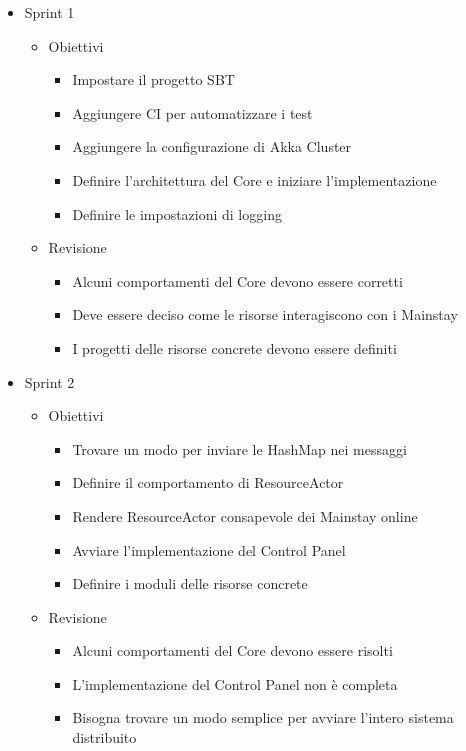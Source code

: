 \documentclass[12pt]{article}
\begin{document}
\begin{itemize}
    \item Sprint 1
    \begin{itemize}
        \item Obiettivi
        \begin{itemize}
            \item Impostare il progetto SBT
            \item Aggiungere CI per automatizzare i test
            \item Aggiungere la configurazione di Akka Cluster
            \item Definire l'architettura del Core e iniziare l'implementazione
            \item Definire le impostazioni di logging
        \end{itemize}
        \item Revisione
        \begin{itemize}
            \item Alcuni comportamenti del Core devono essere corretti
            \item Deve essere deciso come le risorse interagiscono con i Mainstay
            \item I progetti delle risorse concrete devono essere definiti
        \end{itemize}
    \end{itemize}
\end{itemize}

\begin{itemize}
    \item Sprint 2
    \begin{itemize}
        \item Obiettivi
        \begin{itemize}
            \item Trovare un modo per inviare le HashMap nei messaggi
            \item Definire il comportamento di ResourceActor
            \item Rendere ResourceActor consapevole dei Mainstay online
            \item Avviare l'implementazione del Control Panel
            \item Definire i moduli delle risorse concrete
        \end{itemize}
        \item Revisione
        \begin{itemize}
            \item Alcuni comportamenti del Core devono essere risolti
            \item L'implementazione del Control Panel non è completa
            \item Bisogna trovare un modo semplice per avviare l'intero sistema distribuito
        \end{itemize}
    \end{itemize}
\end{itemize}
\end{document}
